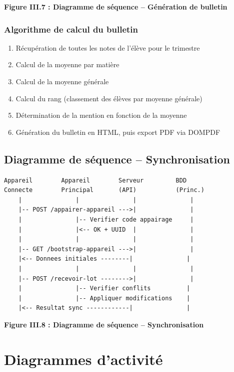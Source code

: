 \documentclass[12pt,a4paper,twoside]{report}
\begin{document}
\begin{center}
\textbf{Figure III.7 : Diagramme de séquence -- Génération de bulletin}
\end{center}

\subsubsection{Algorithme de calcul du bulletin}

\begin{enumerate}
    \item Récupération de toutes les notes de l'élève pour le trimestre
    \item Calcul de la moyenne par matière
    \item Calcul de la moyenne générale
    \item Calcul du rang (classement des élèves par moyenne générale)
    \item Détermination de la mention en fonction de la moyenne
    \item Génération du bulletin en HTML, puis export PDF via DOMPDF
\end{enumerate}

\subsection{Diagramme de séquence -- Synchronisation}

\begin{verbatim}
Appareil        Appareil        Serveur         BDD
Connecte        Principal       (API)           (Princ.)
    |               |               |               |
    |-- POST /appairer-appareil --->|               |
    |               |-- Verifier code appairage     |
    |               |<-- OK + UUID  |               |
    |               |               |               |
    |-- GET /bootstrap-appareil --->|               |
    |<-- Donnees initiales --------|               |
    |               |               |               |
    |-- POST /recevoir-lot -------->|               |
    |               |-- Verifier conflits          |
    |               |-- Appliquer modifications    |
    |<-- Resultat sync ------------|               |
\end{verbatim}

\begin{center}
\textbf{Figure III.8 : Diagramme de séquence -- Synchronisation}
\end{center}

\section{Diagrammes d'activité}
\end{document}
